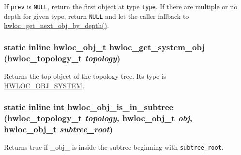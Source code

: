 If {\tt prev} is {\tt NULL}, return the first object at type {\tt type}. If there are multiple or no depth for given type, return {\tt NULL} and let the caller fallback to \hyperlink{group__hwlocality__helper__traversal__basic_g5755cecb9124c5181642ac84dc5bc554}{hwloc\_\-get\_\-next\_\-obj\_\-by\_\-depth()}. \hypertarget{group__hwlocality__helper__traversal__basic_gb39658e42f1046db0f8870a0d0ba9f42}{
\subsubsection[{hwloc\_\-get\_\-system\_\-obj}]{\setlength{\rightskip}{0pt plus 5cm}static inline {\bf hwloc\_\-obj\_\-t} hwloc\_\-get\_\-system\_\-obj ({\bf hwloc\_\-topology\_\-t} {\em topology})}}
\label{group__hwlocality__helper__traversal__basic_gb39658e42f1046db0f8870a0d0ba9f42}


Returns the top-object of the topology-tree. Its type is \hyperlink{group__hwlocality__types_ggcd37bb612667dc437d66bfb175a8dc553aa1b842d1fd4207ebce171f95a244ec}{HWLOC\_\-OBJ\_\-SYSTEM}. 

\hypertarget{group__hwlocality__helper__traversal__basic_g810bf401a37f879f864aa1ab9d10b12f}{
\subsubsection[{hwloc\_\-obj\_\-is\_\-in\_\-subtree}]{\setlength{\rightskip}{0pt plus 5cm}static inline int hwloc\_\-obj\_\-is\_\-in\_\-subtree ({\bf hwloc\_\-topology\_\-t} {\em topology}, \/  {\bf hwloc\_\-obj\_\-t} {\em obj}, \/  {\bf hwloc\_\-obj\_\-t} {\em subtree\_\-root})}}
\label{group__hwlocality__helper__traversal__basic_g810bf401a37f879f864aa1ab9d10b12f}


Returns true if \_\-obj\_\- is inside the subtree beginning with {\tt subtree\_\-root}. 

